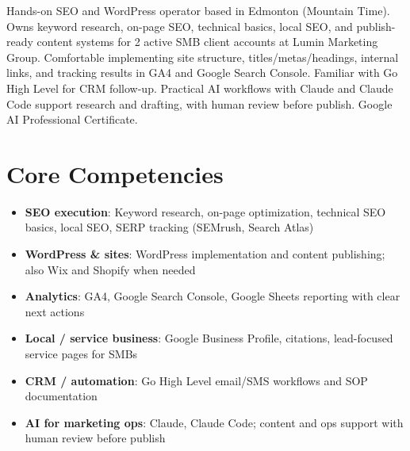 \documentclass[11pt,a4paper,sans]{moderncv}
\begin{document}
\makecvtitle

\vspace{6pt}
\small{Hands-on SEO and WordPress operator based in Edmonton (Mountain Time). Owns keyword research, on-page SEO, technical basics, local SEO, and publish-ready content systems for 2 active SMB client accounts at Lumin Marketing Group. Comfortable implementing site structure, titles/metas/headings, internal links, and tracking results in GA4 and Google Search Console. Familiar with Go High Level for CRM follow-up. Practical AI workflows with Claude and Claude Code support research and drafting, with human review before publish. Google AI Professional Certificate.}

\section{Core Competencies}
\vspace{1pt}
\begin{itemize}
\item \textbf{SEO execution}: Keyword research, on-page optimization, technical SEO basics, local SEO, SERP tracking (SEMrush, Search Atlas)
\item \textbf{WordPress \& sites}: WordPress implementation and content publishing; also Wix and Shopify when needed
\item \textbf{Analytics}: GA4, Google Search Console, Google Sheets reporting with clear next actions
\item \textbf{Local / service business}: Google Business Profile, citations, lead-focused service pages for SMBs
\item \textbf{CRM / automation}: Go High Level email/SMS workflows and SOP documentation
\item \textbf{AI for marketing ops}: Claude, Claude Code; content and ops support with human review before publish
\end{itemize}
\end{document}
